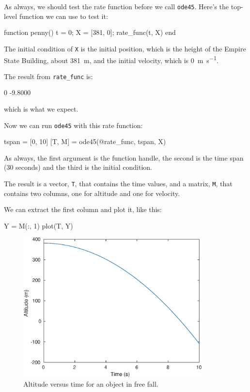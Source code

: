\documentclass[
]{book}
\numberwithin{Answer}{chapter}
\numberwithin{Exercise}{chapter}
\begin{document}

As always, we should test the rate function before we call {\tt ode45}.  Here's the top-level function we can use to test it:

\begin{code}
function penny()
   t = 0;
   X = [381, 0];
   rate_func(t, X)
end
\end{code}

The initial condition of {\tt X} is the initial position, which is the height of the Empire State Building, about \SI{381}{\meter}, and the initial velocity, which is \SI{0}{\meter \per \second}.


The result from \verb"rate_func" is:

\begin{code}
    0
   -9.8000
\end{code}

which is what we expect.

Now we can run {\tt ode45} with this rate function:

\begin{code}
tspan = [0, 10]
[T, M] = ode45(@rate_func, tspan, X)
\end{code}

As always, the first argument is the function handle, the second
is the time span (30 seconds) and the third is the initial
condition.


The result is a vector, {\tt T}, that contains the time values, and a matrix, {\tt M}, that contains two columns, one for altitude and one for velocity.

We can extract the first column and plot it, like this:

\begin{code}
Y = M(:, 1)
plot(T, Y)
\end{code}


\begin{figure}
\centerline{\includegraphics[height=3in]{book/figs/penny.eps}}
\caption{Altitude versus time for an object in free fall.}
\label{fig:penny}
\end{figure}
\end{document}
